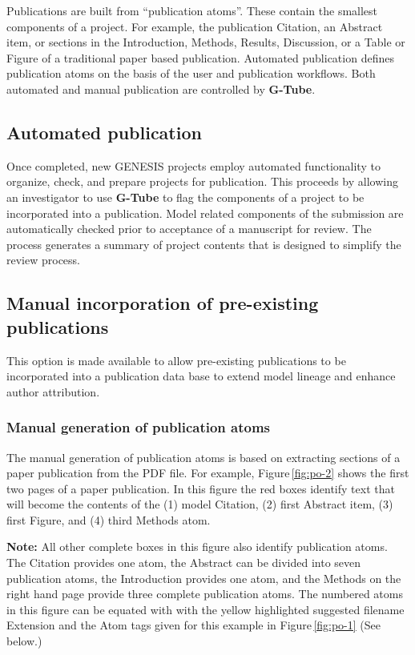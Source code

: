 \documentclass[12pt]{article}
\begin{document}
Publications are built from ``publication atoms''. These contain the smallest components of a project. For example, the publication Citation, an Abstract item, or sections in the Introduction, Methods, Results, Discussion,  or a Table or Figure of a traditional paper based publication. Automated publication defines publication atoms on the basis of the user and publication workflows. Both automated and manual publication are controlled by {\bf G-Tube}.

\subsection*{Automated publication}

Once completed, new GENESIS projects employ automated functionality to organize, check, and prepare projects for publication. This proceeds by allowing an investigator to use {\bf G-Tube} to flag the components of a project to be incorporated into a publication. Model related components of the submission are automatically checked prior to acceptance of a manuscript for review. The process generates a summary of project contents that is designed to simplify the review process.

\subsection*{Manual incorporation of pre-existing publications}

This option is made available to allow pre-existing publications to be incorporated into a publication data base to extend model lineage and enhance author attribution.

\subsubsection*{Manual generation of publication atoms}

The manual generation of publication atoms is based on extracting sections of a paper publication from the PDF file. For example, Figure\,\ref{fig:po-2} shows the first two pages of a paper publication. In this figure the red boxes identify text that will become the contents of the (1) model Citation, (2) first Abstract item, (3) first Figure, and (4) third Methods atom.

{\bf Note:} All other complete boxes in this figure also identify publication atoms. The Citation provides one atom, the Abstract can be divided into seven publication atoms, the Introduction provides one atom, and the Methods on the right hand page provide three complete publication atoms. The numbered atoms in this figure can be equated with with the yellow highlighted suggested filename Extension and the Atom tags given for this example in Figure\,\ref{fig:po-1} (See below.)
\end{document}
